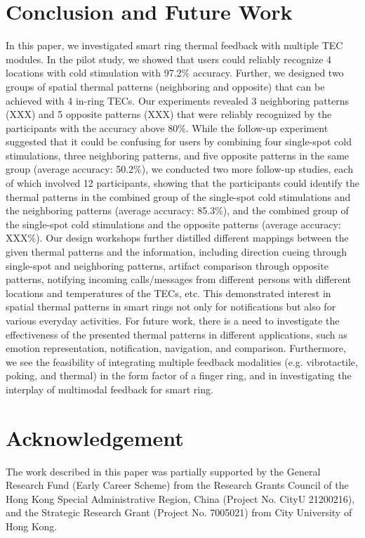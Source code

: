 \documentclass[preprint,12pt]{elsarticle}
\begin{document}
\section{Conclusion and Future Work}
In this paper, we investigated smart ring thermal feedback with multiple TEC modules. In the pilot study, we showed that users could reliably recognize 4 locations with cold stimulation with 97.2\% accuracy. Further, we designed two groups of spatial thermal patterns (neighboring and opposite) that can be achieved with 4 in-ring TECs. Our experiments revealed 3 neighboring patterns (XXX) and 5 opposite patterns (XXX) that were reliably recognized by the participants with the accuracy above 80\%. While the follow-up experiment suggested that it could be confusing for users by combining four single-spot cold stimulations, three neighboring patterns, and five opposite patterns in the same group (average accuracy: 50.2\%), we conducted two more follow-up studies, each of which involved 12 participants, showing that the participants could identify the thermal patterns in the combined group of the single-spot cold stimulations and the neighboring patterns (average accuracy: 85.3\%), and the combined group of the single-spot cold stimulations and the opposite patterns (average accuracy: XXX\%). Our design workshops further distilled different mappings between the given thermal patterns and the information, including direction cueing through single-spot and neighboring patterns, artifact comparison through opposite patterns, notifying incoming calls/messages from different persons with different locations and temperatures of the TECs, etc. This demonstrated interest in spatial thermal patterns in smart rings not only for notifications but also for various everyday activities. For future work, there is a need to investigate the effectiveness of the presented thermal patterns in different applications, such as emotion representation, notification, navigation, and comparison. Furthermore, we see the feasibility of integrating multiple feedback modalities (e.g. vibrotactile, poking, and thermal) in the form factor of a finger ring, and in investigating the interplay of multimodal feedback for smart ring.


\section*{Acknowledgement}
The work described in this paper was partially supported by the General Research Fund (Early Career Scheme) from the Research Grants Council of the Hong Kong Special Administrative Region, China (Project No. CityU 21200216), and the Strategic Research Grant (Project No. 7005021) from City University of Hong Kong.
\end{document}
